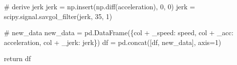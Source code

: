 \documentclass[
  letterpaper,
  DIV=11,
  numbers=noendperiod]{scrreprt}
\newenvironment{Shaded}{\begin{snugshade}}{\end{snugshade}}
\newcommand{\CommentTok}[1]{\textcolor[rgb]{0.37,0.37,0.37}{#1}}
\newcommand{\ControlFlowTok}[1]{\textcolor[rgb]{0.00,0.23,0.31}{#1}}
\newcommand{\DecValTok}[1]{\textcolor[rgb]{0.68,0.00,0.00}{#1}}
\newcommand{\NormalTok}[1]{\textcolor[rgb]{0.00,0.23,0.31}{#1}}
\newcommand{\OperatorTok}[1]{\textcolor[rgb]{0.37,0.37,0.37}{#1}}
\newcommand{\StringTok}[1]{\textcolor[rgb]{0.13,0.47,0.30}{#1}}
\begin{document}
\begin{Shaded}
\begin{Highlighting}[]
            \CommentTok{\# derive jerk}
\NormalTok{            jerk }\OperatorTok{=}\NormalTok{ np.insert(np.diff(acceleration), }\DecValTok{0}\NormalTok{, }\DecValTok{0}\NormalTok{)}
\NormalTok{            jerk }\OperatorTok{=}\NormalTok{ scipy.signal.savgol\_filter(jerk, }\DecValTok{35}\NormalTok{, }\DecValTok{1}\NormalTok{)}

            \CommentTok{\# new\_data}
\NormalTok{            new\_data }\OperatorTok{=}\NormalTok{ pd.DataFrame(\{col }\OperatorTok{+} \StringTok{\textquotesingle{}\_speed\textquotesingle{}}\NormalTok{: speed, col }\OperatorTok{+} \StringTok{\textquotesingle{}\_acc\textquotesingle{}}\NormalTok{: acceleration, col }\OperatorTok{+} \StringTok{\textquotesingle{}\_jerk\textquotesingle{}}\NormalTok{: jerk\})}
\NormalTok{            df }\OperatorTok{=}\NormalTok{ pd.concat([df, new\_data], axis}\OperatorTok{=}\DecValTok{1}\NormalTok{)}

    \ControlFlowTok{return}\NormalTok{ df}
\end{Highlighting}
\end{Shaded}
\end{document}

